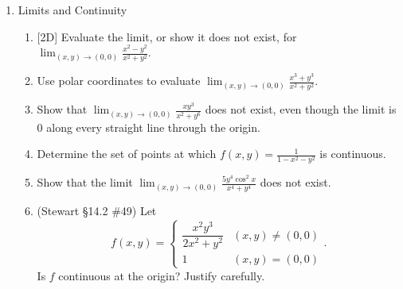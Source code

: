 \documentclass[12pt]{article}
\newcommand{\dimtag}[1]{{\footnotesize\textsc{[#1]}}\;}
\begin{document}
\begin{enumerate}
\begin{enumerate}
        \begin{center}
        \end{center}
        \item Find and sketch the domain of $f(x,y)=\sqrt{9-x^2-y^2}$ and of $g(x,y)=\ln(x-y)$.
        \item Sketch several level curves of $f(x,y)=y-x^2$ and of $g(x,y)=x^2-y^2$.
    \end{enumerate}
\bigskip

\item Limits and Continuity
    \begin{enumerate}
        \item \dimtag{2D} Evaluate the limit, or show it does not exist, for $\displaystyle \lim_{(x,y) \to (0,0)} \frac{x^2 - y^2}{x^2 + y^2}$.
        \item Use polar coordinates to evaluate $\displaystyle \lim_{(x,y) \to (0,0)} \frac{x^3 + y^3}{x^2 + y^2}$.
        \item Show that $\displaystyle \lim_{(x,y) \to (0,0)} \frac{x y^3}{x^2 + y^6}$ does not exist, even though the limit is $0$ along every straight line through the origin.
        \item Determine the set of points at which $f(x,y) = \frac{1}{1 - x^2 - y^2}$ is continuous.
        \item Show that the limit $\displaystyle \lim_{(x,y) \to (0,0)} \frac{5y^4 \cos^2 x}{x^4 + y^4}$ does not exist.
        \item (Stewart \S14.2 \#49) Let
        \[ f(x,y) = \begin{cases} \dfrac{x^2 y^3}{2x^2 + y^2} & (x,y)\neq (0,0)\\ 1 & (x,y) = (0,0)\end{cases}. \]
        Is $f$ continuous at the origin? Justify carefully.
    \end{enumerate}
\newpage


\end{enumerate}
\end{document}
